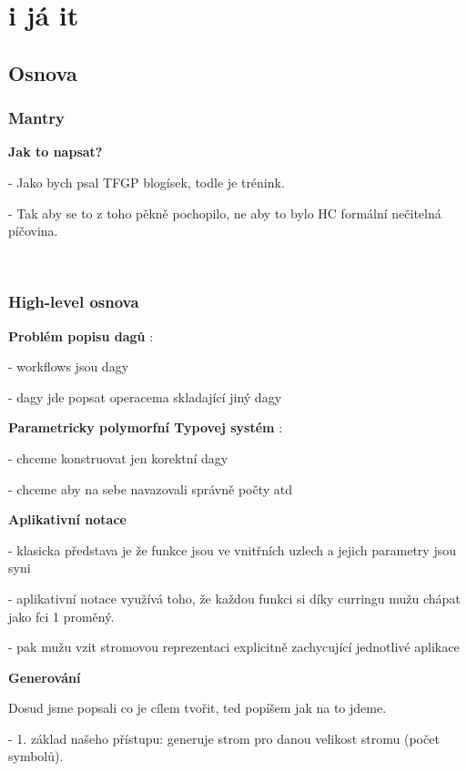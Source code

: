 \documentclass[a4paper,oneside]{memoir}
\begin{document}
\makeatletter
\newcommand{\removelatexerror}{\let\@latex@error\@gobble}
\makeatother

\newcommand{\la}{\leftarrow\xspace}

\chapter{i já it}

\section{Osnova}

\subsection{Mantry}

\textbf{Jak to napsat?}

- Jako bych psal TFGP blogísek, todle je trénink.

- Tak aby se to z toho pěkně pochopilo, ne aby to bylo HC formální nečitelná píčovina.

~\\

\subsection{High-level osnova}

\textbf{Problém popisu dagů} : 

- workflows jsou dagy

- dagy jde popsat operacema skladající jiný dagy

\textbf{Parametricky polymorfní Typovej systém} : 

- chceme konstruovat jen korektní dagy

- chceme aby na sebe navazovali správně počty atd

\textbf{Aplikativní notace}

- klasicka představa je že funkce jsou ve vnitřních uzlech a jejich parametry jsou syni

- aplikativní notace využívá toho, že každou funkci si díky curringu mužu chápat jako fci 1 proměný. 

- pak mužu vzit stromovou reprezentaci explicitně zachycující jednotlivé aplikace

\textbf{Generování}

Dosud jsme popsali co je cílem tvořit, ted popíšem jak na to jdeme.

- 1. základ našeho přístupu: generuje strom pro danou velikost stromu (počet symbolů).
  
\end{document}
